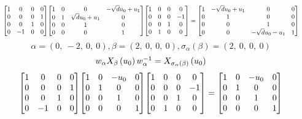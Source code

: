 \documentclass[11pt]{article}
\theoremstyle{definition}
\begin{document}
\[
\scaletoalign{\textwidth}{{\left[\begin{matrix}1 & 0 & 0 & 0\\0 & 0 & 0 & 1\\0 & 0 & 1 & 0\\0 & -1 & 0 & 0\end{matrix}\right]} {\left[\begin{matrix}1 & 0 & 0 & - \sqrt{d} u_{0} + u_{1}\\0 & 1 & \sqrt{d} u_{0} + u_{1} & 0\\0 & 0 & 1 & 0\\0 & 0 & 0 & 1\end{matrix}\right]} {\left[\begin{matrix}1 & 0 & 0 & 0\\0 & 0 & 0 & -1\\0 & 0 & 1 & 0\\0 & 1 & 0 & 0\end{matrix}\right]} = {\left[\begin{matrix}1 & - \sqrt{d} u_{0} + u_{1} & 0 & 0\\0 & 1 & 0 & 0\\0 & 0 & 1 & 0\\0 & 0 & - \sqrt{d} u_{0} - u_{1} & 1\end{matrix}\right]}}
\]
\[
\alpha = \left( 0, \  -2, \  0, \  0\right), \beta = \left( 2, \  0, \  0, \  0\right), \sigma_{\alpha}(\beta) = \left( 2, \  0, \  0, \  0\right)
\]
\[
\scaletoalign{\textwidth}{w_{\alpha} X_{\beta}\left(u_{0}\right) w_{\alpha}^{-1} = X_{\sigma_{\alpha}\left(\beta\right)}\left(u_{0}\right)}
\]
\[
\scaletoalign{\textwidth}{{\left[\begin{matrix}1 & 0 & 0 & 0\\0 & 0 & 0 & 1\\0 & 0 & 1 & 0\\0 & -1 & 0 & 0\end{matrix}\right]} {\left[\begin{matrix}1 & 0 & - u_{0} & 0\\0 & 1 & 0 & 0\\0 & 0 & 1 & 0\\0 & 0 & 0 & 1\end{matrix}\right]} {\left[\begin{matrix}1 & 0 & 0 & 0\\0 & 0 & 0 & -1\\0 & 0 & 1 & 0\\0 & 1 & 0 & 0\end{matrix}\right]} = {\left[\begin{matrix}1 & 0 & - u_{0} & 0\\0 & 1 & 0 & 0\\0 & 0 & 1 & 0\\0 & 0 & 0 & 1\end{matrix}\right]}}
\]
\end{document}
